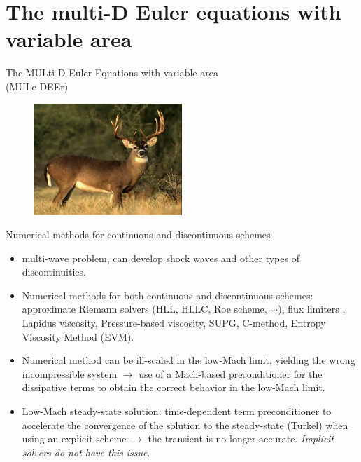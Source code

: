 \documentclass[xcolor=dvipsnames,10pt]{beamer}
\begin{document}
\section{The multi-D Euler equations with variable area}
\begin{frame}
\begin{center}
The MULti-D Euler Equations with variable area \\
(MULe DEEr)
\end{center}
\begin{figure}[H]
\centering
\includegraphics[width=0.5\textwidth]{../figures/Mule_Deer.png}
\end{figure}
\end{frame}
\begin{frame}
\begin{block}{Numerical methods for continuous and discontinuous schemes}
\begin{itemize}
\setlength{\itemsep}{10pt}
\item multi-wave problem, can develop shock waves and other types of discontinuities. 
\item Numerical methods for both continuous and discontinuous schemes: approximate Riemann solvers (HLL, HLLC, Roe scheme, $\cdots$), flux limiters
, Lapidus viscosity, Pressure-based viscosity, SUPG, C-method, Entropy Viscosity Method (EVM). 
\item Numerical method can be ill-scaled in the low-Mach limit, yielding the wrong incompressible system $\to$ use of a Mach-based preconditioner for the dissipative terms to obtain the correct behavior in the low-Mach limit.
\item Low-Mach steady-state solution: time-dependent term preconditioner to accelerate the convergence of the solution to the steady-state (Turkel) when using an explicit scheme $\to$ the transient is no longer accurate. \emph{Implicit solvers do not have this issue}. 
\end{itemize}
\end{block}
\end{frame}
\end{document}
